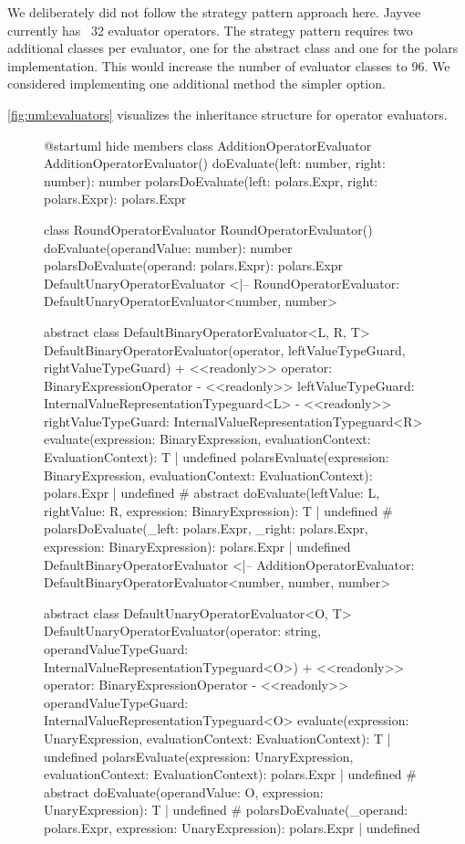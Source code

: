 We deliberately did not follow the strategy pattern approach here.
Jayvee currently has ~32 evaluator operators. %
The strategy pattern requires two additional classes per evaluator, one for the abstract class and one for the polars implementation.
This would increase the number of evaluator classes to 96.
We considered implementing one additional method the simpler option.

\ref{fig:uml:evaluators} visualizes the inheritance structure for operator evaluators.

\begin{figure}
	\begin{plantuml}
		@startuml
		hide members
		class AdditionOperatorEvaluator {
				AdditionOperatorEvaluator()
				doEvaluate(left: number, right: number): number
				polarsDoEvaluate(left: polars.Expr, right: polars.Expr): polars.Expr
			}

		class RoundOperatorEvaluator {
				RoundOperatorEvaluator()
				doEvaluate(operandValue: number): number
				polarsDoEvaluate(operand: polars.Expr): polars.Expr
			}
		DefaultUnaryOperatorEvaluator <|-- RoundOperatorEvaluator: DefaultUnaryOperatorEvaluator<number, number>

		abstract class DefaultBinaryOperatorEvaluator<L, R, T> {
		DefaultBinaryOperatorEvaluator(operator, leftValueTypeGuard, rightValueTypeGuard)
		+ <<readonly>> operator: BinaryExpressionOperator
		- <<readonly>> leftValueTypeGuard: InternalValueRepresentationTypeguard<L>
		- <<readonly>> rightValueTypeGuard: InternalValueRepresentationTypeguard<R>
		evaluate(expression: BinaryExpression, evaluationContext: EvaluationContext): T | undefined
		polarsEvaluate(expression: BinaryExpression, evaluationContext: EvaluationContext): polars.Expr | undefined
		# {abstract} doEvaluate(leftValue: L, rightValue: R, expression: BinaryExpression): T | undefined
		# polarsDoEvaluate(_left: polars.Expr, _right: polars.Expr, expression: BinaryExpression): polars.Expr | undefined
		}
		DefaultBinaryOperatorEvaluator <|-- AdditionOperatorEvaluator: DefaultBinaryOperatorEvaluator<number, number, number>

		abstract class DefaultUnaryOperatorEvaluator<O, T> {
		DefaultUnaryOperatorEvaluator(operator: string, operandValueTypeGuard: InternalValueRepresentationTypeguard<O>)
		+ <<readonly>> operator: BinaryExpressionOperator
		- <<readonly>> operandValueTypeGuard: InternalValueRepresentationTypeguard<O>
		evaluate(expression: UnaryExpression, evaluationContext: EvaluationContext): T | undefined
		polarsEvaluate(expression: UnaryExpression, evaluationContext: EvaluationContext): polars.Expr | undefined
		# {abstract} doEvaluate(operandValue: O, expression: UnaryExpression): T | undefined
		# polarsDoEvaluate(_operand: polars.Expr, expression: UnaryExpression): polars.Expr | undefined
		}


\end{plantuml}
\end{figure}
